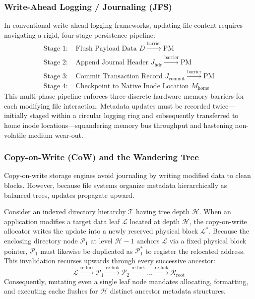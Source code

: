 \documentclass[conference]{IEEEtran}
\begin{document}
\subsubsection{Write-Ahead Logging / Journaling (JFS)}
In conventional write-ahead logging frameworks, updating file content requires navigating a rigid, four-stage persistence pipeline:
\begin{align}
    \text{Stage 1: } & \text{Flush Payload Data } D \xrightarrow{\text{barrier}} \text{PM} \\
    \text{Stage 2: } & \text{Append Journal Header } J_{\text{hdr}} \xrightarrow{\text{barrier}} \text{PM} \\
    \text{Stage 3: } & \text{Commit Transaction Record } J_{\text{commit}} \xrightarrow{\text{barrier}} \text{PM} \\
    \text{Stage 4: } & \text{Checkpoint to Native Inode Location } M_{\text{home}}
\end{align}
This multi-phase pipeline enforces three discrete hardware memory barriers for each modifying file interaction. Metadata updates must be recorded twice---initially staged within a circular logging ring and subsequently transferred to home inode locations---squandering memory bus throughput and hastening non-volatile medium wear-out.

\subsubsection{Copy-on-Write (CoW) and the Wandering Tree}
Copy-on-write storage engines avoid journaling by writing modified data to clean blocks. However, because file systems organize metadata hierarchically as balanced trees, updates propagate upward.

Consider an indexed directory hierarchy $\mathcal{T}$ having tree depth $\mathcal{H}$. When an application modifies a target data leaf $\mathcal{L}$ located at depth $\mathcal{H}$, the copy-on-write allocator writes the update into a newly reserved physical block $\mathcal{L}^*$. Because the enclosing directory node $\mathcal{P}_1$ at level $\mathcal{H}-1$ anchors $\mathcal{L}$ via a fixed physical block pointer, $\mathcal{P}_1$ must likewise be duplicated as $\mathcal{P}_1^*$ to register the relocated address. This invalidation recurses upwards through every successive ancestor:
\begin{equation}
    \mathcal{L} \xrightarrow{\text{re-link}} \mathcal{P}_1 \xrightarrow{\text{re-link}} \mathcal{P}_2 \xrightarrow{\text{re-link}} \dots \xrightarrow{\text{re-link}} \mathcal{R}_{\text{root}}
\end{equation}
Consequently, mutating even a single leaf node mandates allocating, formatting, and executing cache flushes for $\mathcal{H}$ distinct ancestor metadata structures.
\end{document}
